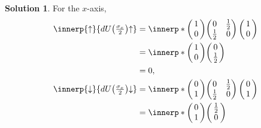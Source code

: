 \documentclass[11pt, a4paper]{report}
\theoremstyle{definition}
\newtheorem{solution}{Solution}[part]
\newenvironment{sol}{\begin{solution}}{\end{solution}\pagebreak[3]}
\begin{document}
\begin{sol}
For the $x$-axis,
\begin{align*}
    \innerp{\uparrow}{dU\bigl(\tfrac{\sigma_x}{2}\bigr) {\uparrow}}
        &= \innerp*{\begin{pmatrix}
                \,1\, \\ 0
            \end{pmatrix}}
            {\begin{pmatrix}
                0            & \tfrac{1}{2} \\
                \tfrac{1}{2} & 0
            \end{pmatrix}
            \begin{pmatrix}
                \,1\, \\ 0
            \end{pmatrix}} \\
        &= \innerp*{\begin{pmatrix}
                \,1\, \\ 0
            \end{pmatrix}}
            {\begin{pmatrix}
                \,0\, \\ \tfrac{1}{2}
            \end{pmatrix}} \\
        &= 0, \\
\innerp{\downarrow}{dU\bigl(\tfrac{\sigma_x}{2}\bigr) {\downarrow}}
        &= \innerp*{\begin{pmatrix}
                \,0\, \\ 1
            \end{pmatrix}}
            {\begin{pmatrix}
                0            & \tfrac{1}{2} \\
                \tfrac{1}{2} & 0
            \end{pmatrix}
            \begin{pmatrix}
                \,0\, \\ 1
            \end{pmatrix}} \\
        &= \innerp*{\begin{pmatrix}
                \,0\, \\ 1
            \end{pmatrix}}
            {\begin{pmatrix}
                \,\tfrac{1}{2}\, \\ 0
            \end{pmatrix}} \\

\end{align*}
\end{sol}
\end{document}
